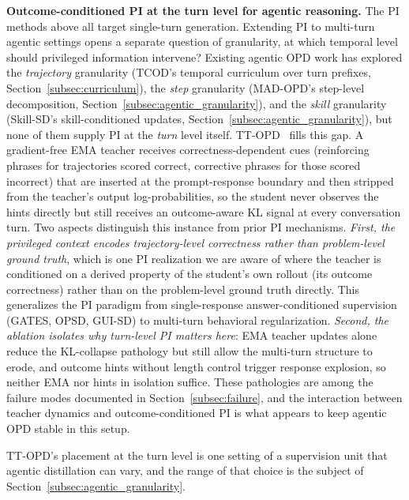 \documentclass{article} %
\begin{document}
\textbf{Outcome-conditioned PI at the turn level for agentic reasoning.} The PI methods above all target single-turn generation. Extending PI to multi-turn agentic settings opens a separate question of granularity, at which temporal level should privileged information intervene? Existing agentic OPD work has explored the \emph{trajectory} granularity (TCOD's temporal curriculum over turn prefixes, Section~\ref{subsec:curriculum}), the \emph{step} granularity (MAD-OPD's step-level decomposition, Section~\ref{subsec:agentic_granularity}), and the \emph{skill} granularity (Skill-SD's skill-conditioned updates, Section~\ref{subsec:agentic_granularity}), but none of them supply PI at the \emph{turn} level itself. TT-OPD~\citep{2605.02943} fills this gap. A gradient-free EMA teacher receives correctness-dependent cues (reinforcing phrases for trajectories scored correct, corrective phrases for those scored incorrect) that are inserted at the prompt-response boundary and then stripped from the teacher's output log-probabilities, so the student never observes the hints directly but still receives an outcome-aware KL signal at every conversation turn. Two aspects distinguish this instance from prior PI mechanisms. \emph{First, the privileged context encodes trajectory-level correctness rather than problem-level ground truth}, which is one PI realization we are aware of where the teacher is conditioned on a derived property of the student's own rollout (its outcome correctness) rather than on the problem-level ground truth directly. This generalizes the PI paradigm from single-response answer-conditioned supervision (GATES, OPSD, GUI-SD) to multi-turn behavioral regularization. \emph{Second, the ablation isolates why turn-level PI matters here}: EMA teacher updates alone reduce the KL-collapse pathology but still allow the multi-turn structure to erode, and outcome hints without length control trigger response explosion, so neither EMA nor hints in isolation suffice. These pathologies are among the failure modes documented in Section~\ref{subsec:failure}, and the interaction between teacher dynamics and outcome-conditioned PI is what appears to keep agentic OPD stable in this setup.

TT-OPD's placement at the turn level is one setting of a supervision unit that agentic distillation can vary, and the range of that choice is the subject of Section~\ref{subsec:agentic_granularity}.
\end{document}
